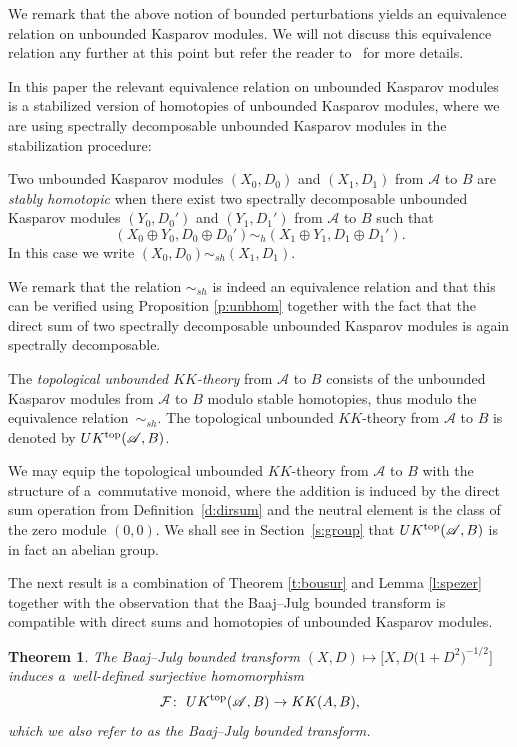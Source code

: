 \documentclass[pdftex]{sigma}
\numberwithin{equation}{section}
\newtheorem{Theorem}{Theorem}[section]
\newcommand{\op}{\oplus}
\newcommand{\C}[1]{\mathcal{#1}}
\newcommand{\s}[1]{\mathscr{#1}}
\begin{document}
We remark that the above notion of bounded perturbations yields an equivalence relation on unbounded Kasparov modules. We will not discuss this equivalence relation any further at this point but refer the reader to~\cite{Kaa:MEU} for more details.

In this paper the relevant equivalence relation on unbounded Kasparov modules is a stabilized version of homotopies of unbounded Kasparov modules, where we are using spectrally decomposable unbounded Kasparov modules in the stabilization procedure:

\begin{dfn}
Two unbounded Kasparov modules $(X_0,D_0)$ and $(X_1,D_1)$ from $\s A$ to $B$ are \emph{stably homotopic} when there exist two spectrally decomposable unbounded Kasparov modules $(Y_0,D_0')$ and $(Y_1,D_1')$ from $\s A$ to $B$ such that
\[
(X_0 \op Y_0,D_0 \op D_0') \sim_h (X_1 \op Y_1, D_1 \op D_1') .
\]
In this case we write $(X_0,D_0) \sim_{sh} (X_1,D_1)$.
\end{dfn}

We remark that the relation $\sim_{sh}$ is indeed an equivalence relation and that this can be verified using Proposition \ref{p:unbhom} together with the fact that the direct sum of two spectrally decomposable unbounded Kasparov modules is again spectrally decomposable.

\begin{dfn}
The \emph{topological unbounded $KK$-theory} from $\s A$ to $B$ consists of the unbounded Kasparov modules from $\s A$ to $B$ modulo stable homotopies, thus modulo the equivalence relation~$\sim_{sh}$. The topological unbounded $KK$-theory from $\s A$ to $B$ is denoted by $UK^{{\rm top}}(\s A, B)$.
\end{dfn}

We may equip the topological unbounded $KK$-theory from $\s A$ to $B$ with the structure of a~commutative monoid, where the addition is induced by the direct sum operation from Definition~\ref{d:dirsum} and the neutral element is the class of the zero module $(0,0)$. We shall see in Section~\ref{s:group} that $UK^{{\rm top}}(\s A,B)$ is in fact an abelian group.

The next result is a combination of Theorem \ref{t:bousur} and Lemma \ref{l:spezer} together with the observation that the Baaj--Julg bounded transform is compatible with direct sums and homotopies of unbounded Kasparov modules.

\begin{Theorem}\label{t:baajul}
The Baaj--Julg bounded transform $(X,D) \mapsto \big[ X, D\big(1 + D^2\big)^{-1/2}\big]$ induces a~well-defined surjective homomorphism
\[
\C F\colon \ UK^{{\rm top}}(\s A, B) \to KK(A,B) ,
\]
which we also refer to as the Baaj--Julg bounded transform.
\end{Theorem}
\end{document}
